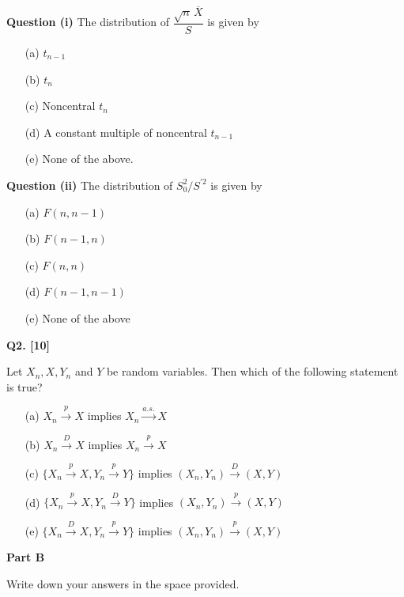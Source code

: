 \documentclass[11pt]{article}
\begin{document}
\textbf{Question (i)} The distribution of $\dfrac{\sqrt{n}\,\overline{X}}{S}$ is given by
\begin{enumerate}
\setlength{\itemsep}{0pt}\setlength{\parsep}{0pt}\setlength{\topsep}{2pt}
\item[(a)] $t_{n-1}$
\item[(b)] $t_n$
\item[(c)] Noncentral $t_n$
\item[(d)] A constant multiple of noncentral $t_{n-1}$
\item[(e)] None of the above.
\end{enumerate}

\textbf{Question (ii)} The distribution of $S_0^2/S^{\prime 2}$ is given by
\begin{enumerate}
\setlength{\itemsep}{0pt}\setlength{\parsep}{0pt}\setlength{\topsep}{2pt}
\item[(a)] $F(n,n-1)$
\item[(b)] $F(n-1,n)$
\item[(c)] $F(n,n)$
\item[(d)] $F(n-1,n-1)$
\item[(e)] None of the above
\end{enumerate}

\bigskip

\textbf{Q2. [10]}

Let $X_n,X,Y_n$ and $Y$ be random variables. Then which of the following statement is true?
\begin{enumerate}
\setlength{\itemsep}{0pt}\setlength{\parsep}{0pt}\setlength{\topsep}{2pt}
\item[(a)] $X_n\xrightarrow{p}X$ implies $X_n\xrightarrow{a.s.}X$
\item[(b)] $X_n\xrightarrow{D}X$ implies $X_n\xrightarrow{p}X$
\item[(c)] $\{X_n\xrightarrow{p}X,Y_n\xrightarrow{p}Y\}$ implies $(X_n,Y_n)\xrightarrow{D}(X,Y)$
\item[(d)] $\{X_n\xrightarrow{p}X,Y_n\xrightarrow{D}Y\}$ implies $(X_n,Y_n)\xrightarrow{p}(X,Y)$
\item[(e)] $\{X_n\xrightarrow{D}X,Y_n\xrightarrow{p}Y\}$ implies $(X_n,Y_n)\xrightarrow{p}(X,Y)$
\end{enumerate}

\bigskip

\begin{center}
\textbf{Part B}
\end{center}

Write down your answers in the space provided.
\end{document}
